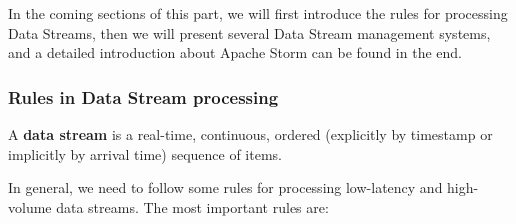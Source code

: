 \documentclass[	DIV=calc,%
							paper=a4,%
							fontsize=11pt,%
							twocolumn]{scrartcl}	 					%
\begin{document}
In the coming sections of this part, we will first introduce the rules for processing Data Streams, then we will present several Data Stream management systems, and a detailed introduction about Apache Storm can be found in the end.


\subsubsection*{Rules in Data Stream processing}


A \textbf{data stream} is a real-time, continuous, ordered (explicitly by timestamp or implicitly by arrival time) sequence of items.



In general, we need to follow some rules for processing low-latency and high-volume data streams. The most important rules are:
\end{document}
